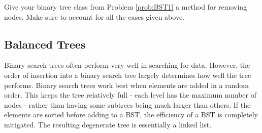 \begin{enumerate}
\begin{minipage}{0.3\textwidth}
\end{minipage}
\begin{minipage}{0.2\textwidth}
   \begin{center}
   \end{center}
\end{minipage}
\begin{minipage}{0.3\textwidth}
\end{minipage}

\end{enumerate}

\begin{problem}
Give your binary tree class from Problem \ref{prob:BST1} a method for removing nodes.
Make sure  to account for all the cases given above.
\label{prob:BST2}
\end{problem}

\subsection*{Balanced Trees}
Binary search trees often perform very well in searching for data.
However, the order of insertion into a binary search tree largely determines how well the tree performs.
Binary search trees work best when elements are added in a random order.
This keeps the tree relatively full - each level has the maximum number of nodes -  rather than having some subtrees being much larger than others.
If the elements are sorted before adding to a BST, the efficiency of a BST is completely mitigated.
The resulting degenerate tree is essentially a linked list.

